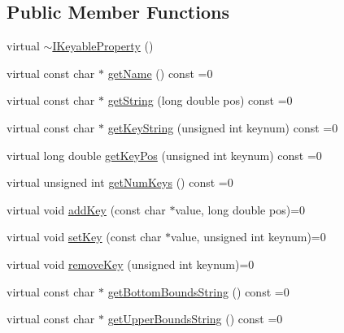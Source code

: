 \subsection*{Public Member Functions}
\begin{DoxyCompactItemize}
\item 
virtual \hyperlink{classmaudio_1_1IKeyableProperty_a252ca5ad4a6b92d9c7adb197b247df4b}{$\sim$\-I\-Keyable\-Property} ()
\item 
virtual const char $\ast$ \hyperlink{classmaudio_1_1IKeyableProperty_a7f216d19b9074b2bda72b54e1c3034ea}{get\-Name} () const =0
\item 
virtual const char $\ast$ \hyperlink{classmaudio_1_1IKeyableProperty_af28a9b9fb457b638624257cdfb2fbeef}{get\-String} (long double pos) const =0
\item 
virtual const char $\ast$ \hyperlink{classmaudio_1_1IKeyableProperty_a219e9bbe5f66145aeb5d7449e0598220}{get\-Key\-String} (unsigned int keynum) const =0
\item 
virtual long double \hyperlink{classmaudio_1_1IKeyableProperty_a6412f2574d0ca4948b81ba62efd695c3}{get\-Key\-Pos} (unsigned int keynum) const =0
\item 
virtual unsigned int \hyperlink{classmaudio_1_1IKeyableProperty_a471a706e69c4c42679fd2e3bd40dee5f}{get\-Num\-Keys} () const =0
\item 
virtual void \hyperlink{classmaudio_1_1IKeyableProperty_abdfffe5b0cdd27083714826014d2dfd9}{add\-Key} (const char $\ast$value, long double pos)=0
\item 
virtual void \hyperlink{classmaudio_1_1IKeyableProperty_ab2785fc6f55d610971f17573d0f5c010}{set\-Key} (const char $\ast$value, unsigned int keynum)=0
\item 
virtual void \hyperlink{classmaudio_1_1IKeyableProperty_a33844ec902186c6c051c833c9a72b33f}{remove\-Key} (unsigned int keynum)=0
\item 
virtual const char $\ast$ \hyperlink{classmaudio_1_1IKeyableProperty_aca107fbec3117a448c48c2cf4f226198}{get\-Bottom\-Bounds\-String} () const =0
\item 
virtual const char $\ast$ \hyperlink{classmaudio_1_1IKeyableProperty_a0cd30ce4a45a13e386968f9890eaada0}{get\-Upper\-Bounds\-String} () const =0
\end{DoxyCompactItemize}


